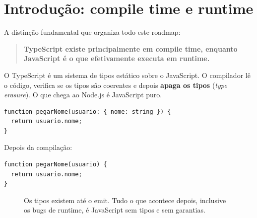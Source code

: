 \documentclass[12pt,a4paper,oneside]{book}
\begin{document}
\chapter{Introdução: compile time e runtime}

A distinção fundamental que organiza todo este roadmap:

\begin{quote}
\textbf{TypeScript existe principalmente em compile time, enquanto JavaScript é o que efetivamente executa em runtime.}
\end{quote}

O TypeScript é um sistema de tipos estático sobre o JavaScript. O compilador lê o código, verifica se os tipos são coerentes e depois \textbf{apaga os tipos} (\emph{type erasure}). O que chega ao Node.js é JavaScript puro.

\begin{verbatim}
function pegarNome(usuario: { nome: string }) {
  return usuario.nome;
}
\end{verbatim}

Depois da compilação:

\begin{verbatim}
function pegarNome(usuario) {
  return usuario.nome;
}
\end{verbatim}

\begin{figure}[h]
\centering
{}
\caption{Os tipos existem até o emit. Tudo o que acontece depois, inclusive os bugs de runtime, é JavaScript sem tipos e sem garantias.}
\end{figure}
\end{document}
